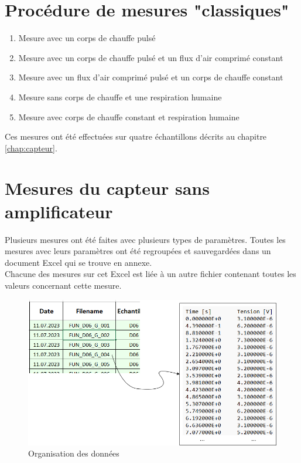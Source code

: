 \section{Procédure de mesures "classiques"}
\begin{enumerate}
    \item Mesure avec un corps de chauffe pulsé\\
    \item Mesure avec un corps de chauffe pulsé et un flux d'air comprimé constant\\
    \item Mesure avec un flux d'air comprimé pulsé et un corps de chauffe constant\\
    \item Mesure sans corps de chauffe et une respiration humaine\\
    \item Mesure avec corps de chauffe constant et respiration humaine
\end{enumerate}
Ces mesures ont été effectuées sur quatre échantillons décrits au chapitre \ref{chap:capteur}. 

\section{Mesures du capteur sans amplificateur}
Plusieurs mesures ont été faites avec plusieurs types de paramètres. Toutes les mesures avec leurs paramètres ont été regroupées et sauvegardées
dans un document Excel qui se trouve en annexe.\\
Chacune des mesures sur cet Excel est liée à un autre fichier contenant toutes les valeurs concernant cette mesure.
\begin{figure}[H]
    \centering
    \includegraphics[scale = 0.4]{assets/figures/Data.png}
    \caption{Organisation des données}
    \label{fig:data_orga}
\end{figure}

